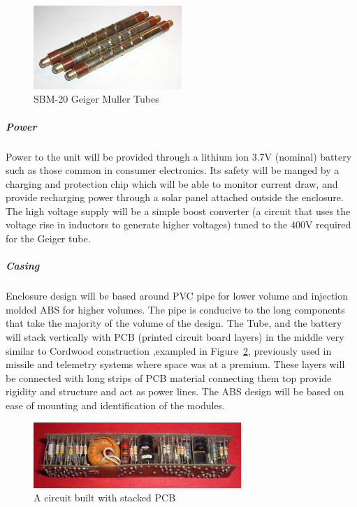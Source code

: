 \documentclass[10pt]{article}
\begin{document}
\begin{figure}[h]
	\centering
	\includegraphics[width=0.5\textwidth]{sbm20}
	\caption{SBM-20 Geiger Muller Tubes \cite{Bodunova-Skvortsova} \label{sbm20}}
\end{figure}

\subparagraph{Power}
Power to the unit will be provided through a lithium ion 3.7V (nominal) battery such 
as those common in consumer electronics. Its safety will be manged by a charging and 
protection chip which will be able to monitor current draw, and provide recharging power 
through a solar panel attached outside the enclosure. The high voltage supply will be a 
simple boost converter (a circuit that uses the voltage rise in inductors to generate 
higher voltages) tuned to the 400V required for the Geiger tube.

\subparagraph{Casing}
Enclosure design will be based around PVC pipe for lower volume and injection molded 
ABS for higher volumes. The pipe is conducive to the long components that take the majority
of the volume of the design. The Tube, and the battery will stack vertically with PCB 
(printed circuit board layers) in the middle very similar to Cordwood construction 
,exampled in Figure~\ref{cordwood}, previously used in missile and telemetry systems 
where space was at a premium. These layers will be connected with long strips of PCB 
material connecting them top provide rigidity and structure and act as power lines. 
The ABS design will be based on ease of mounting and identification of the modules. 

\begin{figure}[h]
	\centering
	\includegraphics[width=0.7\textwidth]{cordwoodcircuit}
	\caption{A circuit built with stacked PCB \cite{ArnoldReinhold} \label{cordwood}}
\end{figure}
\end{document}
